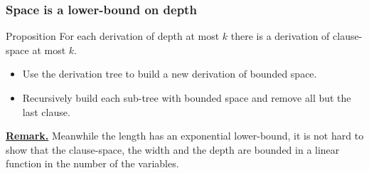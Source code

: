 \documentclass[t,usenames,dvipsnames]{beamer}
\begin{document}
\begin{frame}\frametitle{Space is a lower-bound on depth}
	\begin{block}{Proposition}
		For each derivation of depth at most $k$ there is a derivation of clause-space at
		most $k$.
	\end{block}
	\pause
	\begin{itemize}[<+->]
		\item Use the derivation tree to build a new derivation of bounded space.
		\item Recursively build each sub-tree with bounded space and remove all but the last
			clause.
	\end{itemize}
	\pause
	\noindent \textbf{\underline{Remark.}} Meanwhile the length has an exponential lower-bound,
	it is not hard to show that the clause-space, the width and the depth are bounded in a
	linear function in the number of the variables.
\end{frame}
\end{document}
